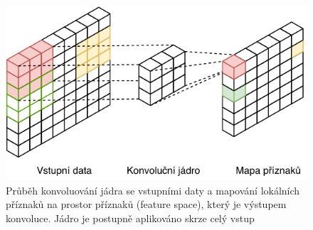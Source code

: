 
\begin{figure}[H]
    \centering
    \includegraphics[scale=1.0]{obrazky-figures/convmapping.pdf}
    \caption{\label{fig:convmapping}Průběh konvoluování jádra se vstupními daty a mapování lokálních příznaků na prostor příznaků (feature space), který je výstupem konvoluce. Jádro je postupně aplikováno skrze celý vstup}
\end{figure}

